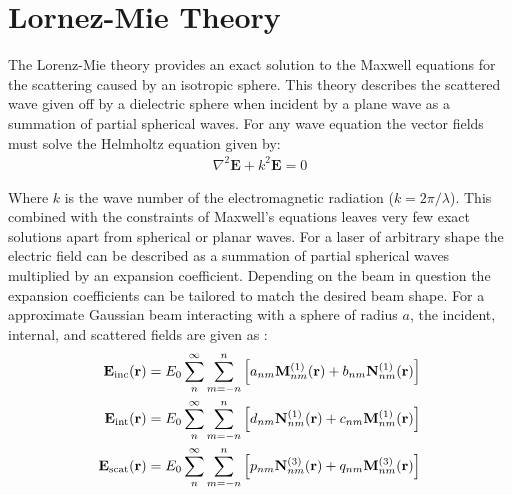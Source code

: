 \section{Lornez-Mie Theory}

The Lorenz-Mie theory provides an exact solution to the Maxwell 
equations for the scattering caused by an isotropic sphere. This 
theory describes the scattered wave given off by a dielectric 
sphere when incident by a plane wave as a summation of partial 
spherical waves. For any wave equation the vector fields must 
solve the Helmholtz equation given by:
\begin{align}
	\nabla^2\mathbf{E} +k^2\mathbf{E} = 0
\end{align} 

Where $k$ is the wave number of the electromagnetic radiation 
($k = 2\pi/\lambda$). This combined with the constraints of 
Maxwell's equations leaves very few exact solutions apart from 
spherical or planar waves. For a laser of arbitrary shape the 
electric field can be described as a summation of partial 
spherical waves multiplied by an expansion coefficient. Depending 
on the beam in question the expansion coefficients can be tailored
to match the desired beam shape. For a approximate Gaussian beam 
interacting with a sphere of radius $a$, the incident, internal, 
and scattered fields are given as \cite{RanhaNeves2019}: 
\begin{align}
	\label{eq:incident}
	{\bf E}_{\rm inc}({\bf r})
	&=
	E_0 \sum_{n}^\infty\sum_{m=-n}^n \left[
	a_{nm}{\bf M}_{nm}^{(1)}({\bf r})
	+ b_{nm}{\bf N}_{nm}^{(1)}({\bf r})\right]
	\\
	\label{eq:internal}
	{\bf E}_{\rm int}({\bf r})
	&=
	E_0 \sum_{n}^\infty \sum_{m=-n}^{n}\left[
	d_{nm}{\bf N}_{nm}^{(1)}({\bf r}) + c_{nm}{\bf M}_{nm}^{(1)}({\bf r})
	\right]
	\\
	\label{eq:scattered}
	{\bf E}_{\rm scat}({\bf r})
	&=
	E_0 \sum_{n}^\infty \sum_{m=-n}^n\left[
	p_{nm}{\bf N}_{nm}^{(3)}({\bf r})+q_{nm}{\bf M}_{nm}^{(3)}({\bf r})
	\right] 
\end{align}

